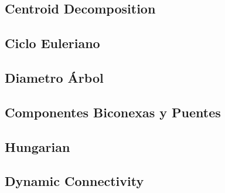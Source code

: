 \subsection{Centroid Decomposition}

\subsection{Ciclo Euleriano}

\subsection{Diametro \'Arbol}

\subsection{Componentes Biconexas y Puentes}

\subsection{Hungarian}

\subsection{Dynamic Connectivity}
